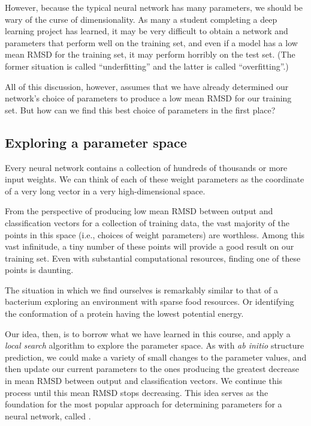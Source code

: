 However, because the typical neural network has many parameters, we should be wary of the curse of dimensionality. As many a student completing a deep learning project has learned, it may be very difficult to obtain a network and parameters that perform well on the training set, and even if a model has a low mean RMSD for the training set, it may perform horribly on the test set. (The former situation is called ``underfitting'' and the latter is called ``overfitting''.)

All of this discussion, however, assumes that we have already determined our network's choice of parameters to produce a low mean RMSD for our training set. But how can we find this best choice of parameters in the first place?

\subsection{Exploring a parameter space}

Every neural network contains a collection of hundreds of thousands or more input weights. We can think of each of these weight parameters as the coordinate of a very long vector in a very high-dimensional space.

From the perspective of producing low mean RMSD between output and classification vectors for a collection of training data, the vast majority of the points in this space (i.e., choices of weight parameters) are worthless. Among this vast infinitude, a tiny number of these points will provide a good result on our training set. Even with substantial computational resources, finding one of these points is daunting.

The situation in which we find ourselves is remarkably similar to that of a bacterium exploring an environment with sparse food resources. Or identifying the conformation of a protein having the lowest potential energy.

Our idea, then, is to borrow what we have learned in this course, and apply a \textit{local search} algorithm to explore the parameter space. As with \textit{ab initio} structure prediction, we could make a variety of small changes to the parameter values, and then update our current parameters to the ones producing the greatest decrease in mean RMSD between output and classification vectors. We continue this process until this mean RMSD stops decreasing. This idea serves as the foundation for the most popular approach for determining parameters for a neural network, called .\\

